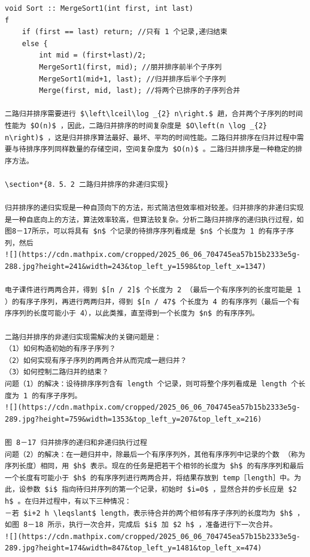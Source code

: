 \documentclass[10pt]{article}
\begin{document}
\begin{verbatim}
void Sort :: MergeSort1(int first, int last)
f
    if (first == last) return; //只有 1 个记录,递归结束
    else {
        int mid = (first+last)/2;
        MergeSort1(first, mid); //朋并排序前半个子序列
        MergeSort1(mid+1, last); //归并排序后半个子序列
        Merge(first, mid, last); //将两个已排序的子序列合并

二路归并排序需要进行 $\left\lceil\log _{2} n\right.$ 趟，合并两个子序列的时间性能为 $O(n)$ ，因此，二路归并排序的时间复杂度是 $O\left(n \log _{2} n\right)$ ，这是归并排序算法最好、最坏、平均的时间性能。二路归并排序在归并过程中需要与待排序序列同样数量的存储空间，空间复杂度为 $O(n)$ 。二路归并排序是一种稳定的排序方法。

\section*{8．5．2 二路归并排序的非递归实现}

归并排序的递归实现是一种自顶向下的方法，形式简洁但效率相对较差。归并排序的非递归实现是一种自底向上的方法，算法效率较高，但算法较复杂。分析二路归并排序的递归执行过程，如图8－17所示，可以将具有 $n$ 个记录的待排序序列看成是 $n$ 个长度为 1 的有序子序列，然后
![](https://cdn.mathpix.com/cropped/2025_06_06_704745ea57b15b2333e5g-288.jpg?height=241&width=243&top_left_y=1598&top_left_x=1347)

电子课件进行两两合并，得到 $[n / 2]$ 个长度为 2 （最后一个有序序列的长度可能是 1 ）的有序子序列，再进行两两归并，得到 $[n / 47$ 个长度为 4 的有序序列（最后一个有序序列的长度可能小于 4），以此类推，直至得到一个长度为 $n$ 的有序序列。

二路归并排序的非递归实现需解决的关键问题是：
（1）如何构造初始的有序子序列？
（2）如何实现有序子序列的两两合并从而完成一趟归并？
（3）如何控制二路归并的结束？
问题（1）的解决：设待排序序列含有 length 个记录，则可将整个序列看成是 length 个长度为 1 的有序子序列。
![](https://cdn.mathpix.com/cropped/2025_06_06_704745ea57b15b2333e5g-289.jpg?height=759&width=1353&top_left_y=207&top_left_x=216)

图 8－17 归并排序的递归和非递归执行过程
问题（2）的解决：在一趟归并中，除最后一个有序序列外，其他有序序列中记录的个数 （称为序列长度）相同，用 $h$ 表示。现在的任务是把若干个相邻的长度为 $h$ 的有序序列和最后一个长度有可能小于 $h$ 的有序序列进行两两合并，将结果存放到 temp［length］中。为此，设参数 $i$ 指向待归并序列的第一个记录，初始时 $i=0$ ，显然合并的步长应是 $2 h$ 。在归并过程中，有以下三种情况：
－若 $i+2 h \leqslant$ length，表示待合并的两个相邻有序子序列的长度均为 $h$ ，如图 8－18 所示，执行一次合并，完成后 $i$ 加 $2 h$ ，准备进行下一次合并。
![](https://cdn.mathpix.com/cropped/2025_06_06_704745ea57b15b2333e5g-289.jpg?height=174&width=847&top_left_y=1481&top_left_x=474)


\end{verbatim}
\end{document}
